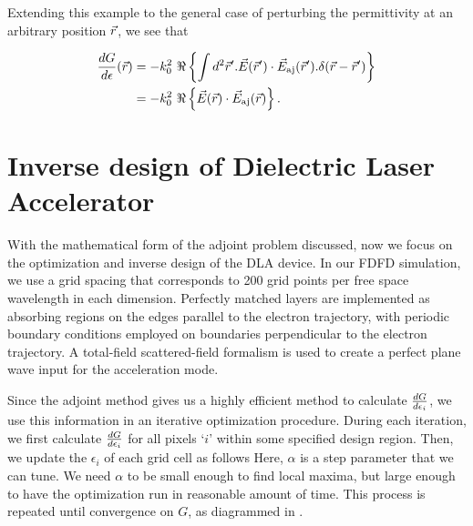 Extending this example to the general case of perturbing the permittivity at an arbitrary position $\vec{r}$, we see that

\begin{align}
    \frac{d G}{d \epsilon}(\vec{r}) &= -k_0^2 \  \Re \left\{  \int{d^2\vec{r}'}.
    \vec{E}(\vec{r}') \cdot \vec{E}_{\textrm{aj}}(\vec{r}').
    \delta(\vec{r}-\vec{r}')  \right\}  \\
    &= -k_0^2 \  \Re \left\{  \vec{E}(\vec{r}) \cdot \vec{E}_{\textrm{aj}}(\vec{r})  \right\} .
\end{align}

\section{Inverse design of Dielectric Laser Accelerator}

With the mathematical form of the adjoint problem discussed, now we focus on the optimization and inverse design of the DLA device.
In our FDFD simulation, we use a grid spacing that corresponds to 200 grid points per free space wavelength in each dimension.
Perfectly matched layers are implemented as absorbing regions on the edges parallel to the electron trajectory, with periodic boundary conditions employed on boundaries perpendicular to the electron trajectory.
A total-field scattered-field \cite{taflove2000computational} formalism is used to create a perfect plane wave input for the acceleration mode.

Since the adjoint method gives us a highly efficient method to calculate $\frac{d G}{d \epsilon_{i}}$, we use this information in an iterative optimization procedure.
During each iteration, we first calculate $\frac{d G}{d \epsilon_{i}}$ for all pixels `$i$' within some specified design region.
Then, we update the $\epsilon_i$ of each grid cell as follows
%
%
Here, $\alpha$ is a step parameter that we can tune.
We need $\alpha$ to be small enough to find local maxima, but large enough to have the optimization run in reasonable amount of time.
This process is repeated until convergence on $G$, as diagrammed in .


